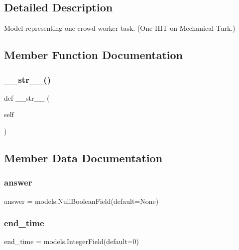 \subsection{Detailed Description}
\begin{DoxyVerb}Model representing one crowd worker task. (One HIT on Mechanical Turk.)
\end{DoxyVerb}
 

\subsection{Member Function Documentation}
\mbox{\label{classdynamicfilterapp_1_1models_1_1_task_a23e8041ce1015febe4fdace3225714f9}} 
\subsubsection{\texorpdfstring{\_\_str\_\_()}{\_\_str\_\_()}}
{\footnotesize\ttfamily def \+\_\+\+\_\+str\+\_\+\+\_\+ (\begin{DoxyParamCaption}\item[{}]{self }\end{DoxyParamCaption})}



\subsection{Member Data Documentation}
\mbox{\label{classdynamicfilterapp_1_1models_1_1_task_a8c4d9ee8d4f82d724070b97e70b9c4e5}} 
\subsubsection{\texorpdfstring{answer}{answer}}
{\footnotesize\ttfamily answer = models.\+Null\+Boolean\+Field(default=None)\hspace{0.3cm}{\ttfamily [static]}}

\mbox{\label{classdynamicfilterapp_1_1models_1_1_task_aa18736cc12f8beb112bd108c5a09ef8d}} 
\subsubsection{\texorpdfstring{end\_time}{end\_time}}
{\footnotesize\ttfamily end\+\_\+time = models.\+Integer\+Field(default=0)\hspace{0.3cm}{\ttfamily [static]}}


